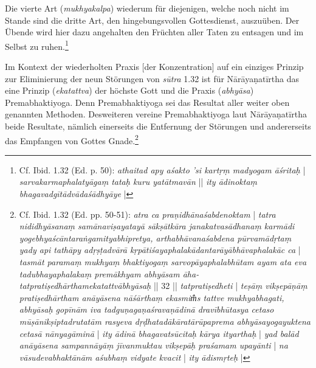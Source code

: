 Die vierte Art (\textit{mukhyakalpa}) wiederum für diejenigen, welche noch nicht im Stande sind die dritte Art, den hingebungsvollen Gottesdienst, auszuüben. Der Übende wird hier dazu angehalten den Früchten aller Taten zu entsagen und im Selbst zu ruhen.\footnote{Cf. Ibid. 1.32 (Ed. p. 50): \textit{athaitad apy aśakto 'si kartṛṃ madyogam āśritaḥ} | \textit{sarvakarmaphalatyāgaṃ tataḥ kuru yatātmavān} || \textit{ity ādinoktaṃ bhagavadgītādvādaśādhyāye} |} 

Im Kontext der wiederholten Praxis [der Konzentration] auf ein einziges Prinzip zur Eliminierung der neun Störungen von \textit{sūtra} 1.32 ist für Nārāyaṇatīrtha das eine Prinzip (\textit{ekatattva}) der höchste Gott und die Praxis (\textit{abhyāsa}) Premabhaktiyoga. Denn Premabhaktiyoga sei das Resultat aller weiter oben genannten Methoden. Desweiteren vereine Premabhaktiyoga laut Nārāyaṇatīrtha beide Resultate, nämlich einerseits die Entfernung der Störungen und andererseits das Empfangen von Gottes Gnade.\footnote{Cf. Ibid. 1.32 (Ed. pp. 50-51): \textit{atra ca praṇidhānaśabdenoktam} | \textit{tatra nididhyāsanaṃ samānaviṣayatayā sākṣātkāra janakatvasādhanaṃ karmādi yogebhyaścāntaraṅgamityabhipretya, arthabhāvanaśabdena pūrvamādṛtaṃ yady api tathāpy adṛṣṭadvārā kṛpātiśayaphalakādantarāyābhāvaphalakāc ca }| \textit{tasmāt paramaṃ mukhyaṃ bhaktiyogaṃ sarvopāyaphalabhūtam ayam ata eva tadubhayaphalakaṃ premākhyam abhyāsam āha- tatpratiṣedhārthamekatattvābhyāsaḥ} || 32 ||  \textit{tatpratiṣedheti} | \textit{teṣāṃ vikṣepāṇāṃ pratiṣedhārtham anāyāsena nāśārthaṃ ekasmim̐s tattve mukhyabhagati, abhyāsaḥ gopīnām iva tadguṇagaṇaśravaṇādinā dravībhūtasya cetaso mūṣānikṣiptadrutatām rasyeva dṛḍhatadākāratārūpaprema abhyāsayogayuktena cetasā nānyagāminā} | \textit{ity ādinā bhagavatsūcitaḥ kārya ityarthaḥ} | \textit{yad balād anāyāsena sampannāyāṃ jīvanmuktau vikṣepāḥ praśamam upayānti} | \textit{na vāsudevabhaktānām aśubhaṃ vidyate kvacit} | \textit{ity ādismṛteḥ} |}

